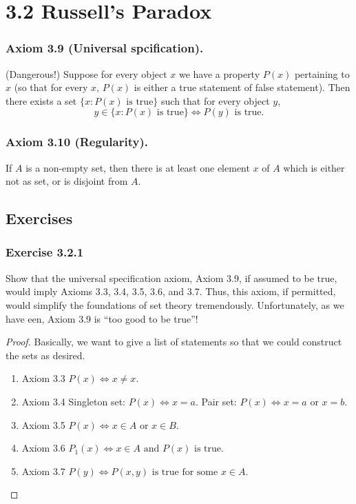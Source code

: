 \documentclass[12pt, letter]{article}
\begin{document}
\section*{3.2 Russell's Paradox}
\subsubsection*{Axiom 3.9 (Universal spcification).}
(Dangerous!) Suppose for every object $x$ we have a property $P(x)$ pertaining to $x$ (so that for every $x$, $P(x)$ is either a true statement of false statement). 
Then there exists a set $\{x:P(x)\text{ is true}\}$ such that for every object $y$,
\begin{equation*}
    y\in\{x:P(x)\text{ is true}\} \iff P(y) \text{ is true}.
\end{equation*}
\subsubsection*{Axiom 3.10 (Regularity).}
If $A$ is a non-empty set, then there is at least one element $x$ of $A$ which is either not as set, or is disjoint from $A$.

\subsection*{Exercises}
\subsubsection*{Exercise 3.2.1}
Show that the universal specification axiom, Axiom 3.9, if assumed to be true, would imply Axioms 3.3, 3.4, 3.5, 3.6, and 3.7. Thus, this axiom, if 
permitted, would simplify the foundations of set theory tremendously. Unfortunately, as we have een, Axiom 3.9 is ``too good to be true''!
\begin{proof}
    Basically, we want to give a list of statements so that we could construct the sets as desired.
    \begin{enumerate}
        \item Axiom 3.3 
        $P(x)\iff x\ne x$.
        \item Axiom 3.4
        Singleton set: $P(x)\iff x=a$.
        Pair set: $P(x)\iff x=a \text{ or } x=b$.
        \item Axiom 3.5
        $P(x)\iff x\in A\text{ or }x\in B$.
        \item Axiom 3.6
        $P_1(x)\iff x\in A\text{ and }P(x)\text{ is true}$.
        \item Axiom 3.7 
        $P(y)\iff P(x,y)\text{ is true for some }x\in A$.
    \end{enumerate}
\end{proof}
\end{document}
